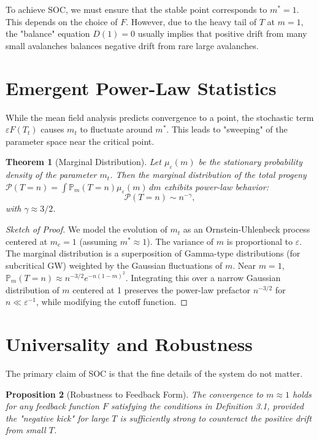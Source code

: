 \documentclass[11pt, a4paper]{article}
\newtheorem{theorem}{Theorem}[section]
\newtheorem{proposition}[theorem]{Proposition}
\theoremstyle{definition}
\renewcommand{\P}{\mathbb{P}}
\begin{document}
To achieve SOC, we must ensure that the stable point corresponds to $m^* = 1$. This depends on the choice of $F$. However, due to the heavy tail of $T$ at $m=1$, the "balance" equation $D(1) = 0$ usually implies that positive drift from many small avalanches balances negative drift from rare large avalanches.

\section{Emergent Power-Law Statistics}

While the mean field analysis predicts convergence to a point, the stochastic term $\varepsilon F(T_t)$ causes $m_t$ to fluctuate around $m^*$. This leads to "sweeping" of the parameter space near the critical point.

\begin{theorem}[Marginal Distribution]
Let $\mu_\varepsilon(m)$ be the stationary probability density of the parameter $m_t$. Then the marginal distribution of the total progeny $\mathcal{P}(T=n) = \int \P_m(T=n) \mu_\varepsilon(m) \, dm$ exhibits power-law behavior:
\begin{equation}
    \mathcal{P}(T=n) \sim n^{-\gamma},
\end{equation}
with $\gamma \approx 3/2$.
\end{theorem}

\begin{proof}[Sketch of Proof]
We model the evolution of $m_t$ as an Ornstein-Uhlenbeck process centered at $m_c=1$ (assuming $m^* \approx 1$). The variance of $m$ is proportional to $\varepsilon$. The marginal distribution is a superposition of Gamma-type distributions (for subcritical GW) weighted by the Gaussian fluctuations of $m$.
Near $m=1$, $\P_m(T=n) \approx n^{-3/2} e^{-n(1-m)^2}$.
Integrating this over a narrow Gaussian distribution of $m$ centered at 1 preserves the power-law prefactor $n^{-3/2}$ for $n \ll \varepsilon^{-1}$, while modifying the cutoff function.
\end{proof}

\section{Universality and Robustness}

The primary claim of SOC is that the fine details of the system do not matter.

\begin{proposition}[Robustness to Feedback Form]
The convergence to $m \approx 1$ holds for any feedback function $F$ satisfying the conditions in Definition 3.1, provided the "negative kick" for large $T$ is sufficiently strong to counteract the positive drift from small $T$.
\end{proposition}
\end{document}
